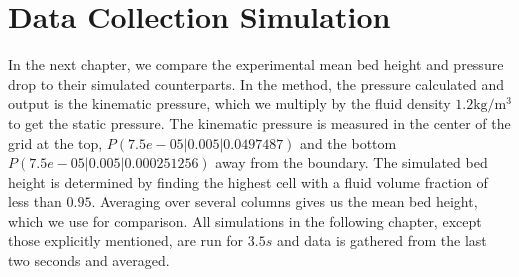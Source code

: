 \section{Data Collection Simulation}
In the next chapter, we compare the experimental mean bed height and pressure drop to their simulated counterparts.
In the \MP method, the pressure calculated and output is the kinematic pressure, which we multiply by the fluid density $1.2 \operatorname{kg/m^3}$ to get the static pressure.
The kinematic pressure is measured in the center of the grid at the top, $P(7.5e-05| 0.005| 0.0497487)$ 
and the bottom $P(7.5e-05| 0.005| 0.000251256)$ 
away from the boundary. 
The simulated bed height is determined by finding the highest cell with a fluid volume fraction of less than $0.95$.
Averaging over several columns gives us the mean bed height, which we use for comparison.
All simulations in the following chapter, except those explicitly mentioned, are run for $3.5s$ and data is gathered from the last two seconds and averaged.







